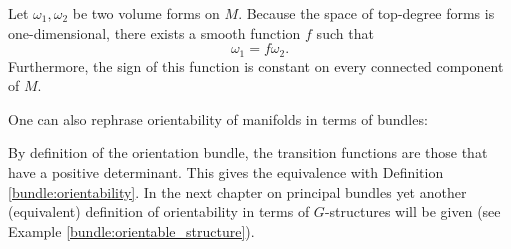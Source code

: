     \begin{property}
        Let $\omega_1,\omega_2$ be two volume forms on $M$. Because the space of top-degree forms is one-dimensional, there exists a smooth function $f$ such that \[\omega_1 = f\omega_2.\] Furthermore, the sign of this function is constant on every connected component of $M$.
    \end{property}

    One can also rephrase orientability of manifolds in terms of bundles:

    \begin{remark}
        By definition of the orientation bundle, the transition functions are those that have a positive determinant. This gives the equivalence with Definition \ref{bundle:orientability}. In the next chapter on principal bundles yet another (equivalent) definition of orientability in terms of $G$-structures will be given (see Example \ref{bundle:orientable_structure}).
    \end{remark}

